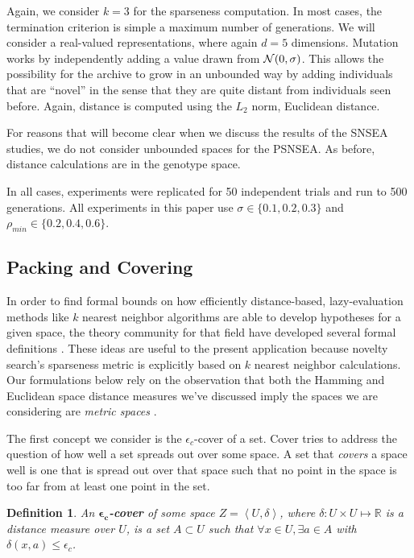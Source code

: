 \documentclass[twoside]{article}
\newtheorem{definition}{Definition}
\newcommand{\IR}{\mathbb{R}}
\begin{document}
Again, we consider $k=3$ for the sparseness computation.  In most cases, the termination criterion is simple a maximum number of generations.  We will consider a real-valued representations, where again $d=5$ dimensions.  Mutation works by independently adding a value drawn from ${\cal N}(0,\sigma)$.  This allows the possibility for the archive to grow in an unbounded way by adding individuals that are ``novel'' in the sense that they are quite distant from individuals seen before.  Again, distance is computed using the $L_2$ norm, Euclidean distance.

For reasons that will become clear when we discuss the results of the SNSEA studies, we do not consider unbounded spaces for the PSNSEA.  As before, distance calculations are in the genotype space.

In all cases, experiments were replicated for 50 independent trials and run to 500 generations. All experiments in this paper use $\sigma\in\{0.1,0.2,0.3\}$ and $\rho_{min} \in \{0.2,0.4,0.6\}$. 


\subsection{Packing and Covering}
\label{subsec:knn}

In order to find formal bounds on how efficiently distance-based, lazy-evaluation methods like $k$ nearest neighbor algorithms are able to develop hypotheses for a given space, the theory community for that field have developed several formal definitions \citep{Clarkson1999dcg}.  These ideas are useful to the present application because novelty search's sparseness metric is explicitly based on $k$ nearest neighbor calculations.  Our formulations below rely on the observation that both the Hamming and Euclidean space distance measures we've discussed imply the spaces we are considering are \emph{metric spaces} \citep{Bryant1985}.

The first concept we consider is the $\epsilon_c$-cover of a set.  Cover tries to address the question of how well a set spreads out over some space.  A set that \emph{covers} a space well is one that is spread out over that space such that no point in the space is too far from at least one point in the set.

\begin{definition}
An $\boldsymbol{\epsilon_c}$\textbf{-cover} of some space $Z=\left\langle U, \delta\right\rangle$, where $\delta: U\times U \mapsto \IR$ is a distance measure over $U$, is a set $A \subset U$ such that $\forall x\in U, \exists a\in A$ with $\delta(x,a) \leq \epsilon_c$. 
\end{definition}
\end{document}
